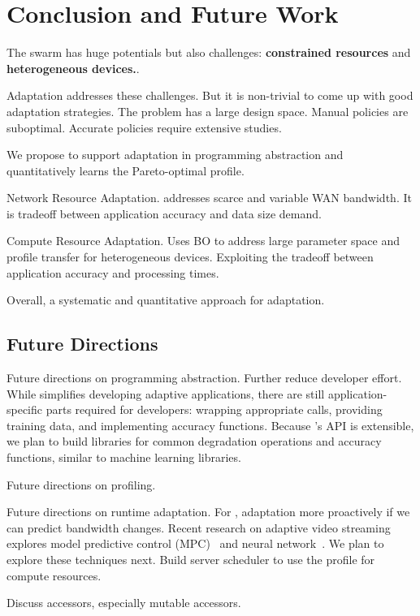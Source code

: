 \documentclass[thesis.tex]{subfiles}
\begin{document}
\chapter{Conclusion and Future Work}
\label{cha:concl-future-work}


The swarm has huge potentials but also challenges: \textbf{constrained
  resources} and \textbf{heterogeneous devices.}.

Adaptation addresses these challenges. But it is non-trivial to come up with
good adaptation strategies. The problem has a large design space. Manual
policies are suboptimal. Accurate policies require extensive studies.

We propose to support adaptation in programming abstraction and quantitatively
learns the Pareto-optimal profile.

Network Resource Adaptation. \awstream{} addresses scarce and variable WAN
bandwidth. It is tradeoff between application accuracy and data size demand.

Compute Resource Adaptation. Uses BO to address large parameter space and
profile transfer for heterogeneous devices. Exploiting the tradeoff between
application accuracy and processing times.

Overall, a systematic and quantitative approach for adaptation.

\section{Future Directions}
\label{sec:future-directions}

Future directions on programming abstraction. Further reduce developer
effort. While \awstream{} simplifies developing adaptive applications, there are
still application-specific parts required for developers: wrapping appropriate
\maybe{} calls, providing training data, and implementing accuracy
functions. Because \awstream{}'s API is extensible, we plan to build libraries
for common degradation operations and accuracy functions, similar to machine
learning libraries.

Future directions on profiling.

Future directions on runtime adaptation. For \awstream{}, adaptation more
proactively if we can predict bandwidth changes. Recent research on adaptive
video streaming explores model predictive control (MPC)~\cite{yin2015control,
  sun2016cs2p} and neural network~\cite{mao2017neural}. We plan to explore these
techniques next. Build server scheduler to use the profile for compute
resources.

Discuss accessors, especially mutable accessors.
\end{document}
